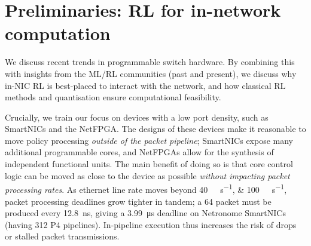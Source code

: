 \documentclass[sigconf,natbib=false]{acmart}
\begin{document}
%

\section{Preliminaries: RL for in-network computation}\label{sec:motivation}
We discuss recent trends in programmable switch hardware.
By combining this with insights from the ML/RL communities (past and present), we discuss why in-NIC RL is best-placed to interact with the network, and how classical RL methods and quantisation ensure computational feasibility.

Crucially, we train our focus on devices with a low port density, such as SmartNICs and the NetFPGA.
The designs of these devices make it reasonable to move policy processing \emph{outside of the packet pipeline}; SmartNICs expose many additional programmable cores, and NetFPGAs allow for the synthesis of independent functional units.
The main benefit of doing so is that core control logic can be moved as close to the device as possible \emph{without impacting packet processing rates}.
As ethernet line rate moves beyond \SIlist{40;100}{\giga\bit\per\second}, packet processing deadlines grow tighter in tandem; a \SI{64}{\byte} packet must be produced every \SI{12.8}{\nano\second}, giving a \SI{3.99}{\micro\second} deadline on Netronome SmartNICs (having \num{312} P4 pipelines).
In-pipeline execution thus increases the risk of drops or stalled packet transmissions.


\end{document}
